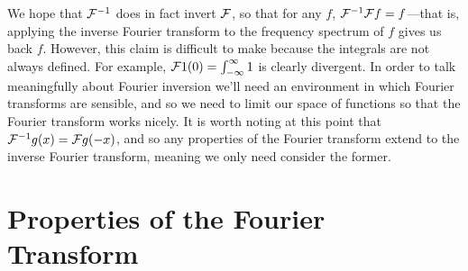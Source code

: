     We hope that $\mathcal{F}^{-1}$ does in fact invert $\mathcal{F}$, so that for any $f$, $\mathcal{F}^{-1}\mathcal{F} f = f$---that is, applying the inverse Fourier transform to the frequency spectrum of $f$ gives us back $f$.
    However, this claim is difficult to make because the integrals are not always defined.
    For example, $\mathcal{F}1(0)=\int_{-\infty}^\infty1$ is clearly divergent.
    In order to talk meaningfully about Fourier inversion we'll need an environment in which Fourier transforms are sensible, and so we need to limit our space of functions so that the Fourier transform works nicely.
    It is worth noting at this point that $\mathcal{F}^{-1}g(x) = \mathcal{F} g(-x)$, and so any properties of the Fourier transform extend to the inverse Fourier transform, meaning we only need consider the former.

    \section{Properties of the Fourier Transform}
%  

